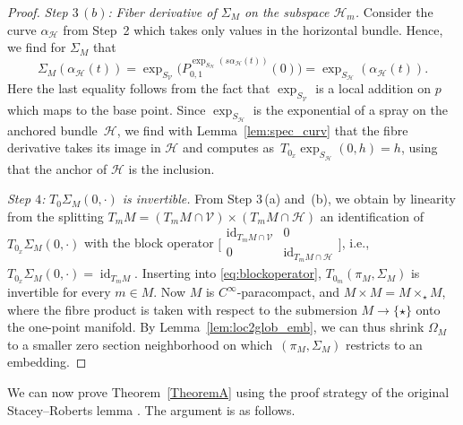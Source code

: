 \documentclass[11pt]{article}
\numberwithin{equation}{section}
\numberwithin{equation}{section}
\newcommand{\cH}{\ensuremath{\mathcal{H}}}
\newcommand{\cV}{\ensuremath{\mathcal{V}}}
\DeclareMathOperator{\id}{id}
\begin{document}
\begin{proof}
{\it Step $3\,(b)$:} \emph{Fiber derivative of $\Sigma_M$ on the subspace $\cH_m$.} Consider the curve $\alpha_\cH$ from Step~2 which takes only values in the horizontal bundle. Hence, we find for $\Sigma_M$ that
\begin{displaymath}\Sigma_M (\alpha_{\cH}(t)) =\exp_{S_{\cV}}\bigl(P_{0,1}^{\exp_{S_\cH}(s\alpha_{\cH}(t))}(0)\bigr)=\exp_{S_\cH}(\alpha_\cH(t)).
\end{displaymath}
Here the last equality follows from the fact that $\exp_{S_{\cV}}$ is a local addition on $p$ which maps \smash{$0\raisebox{2pt}{${}_{\exp_{S_{\cH}}(\alpha_\cH(t))}$}$} to the base point. Since $\exp_{S_\cH}$ is the exponential of a spray on the anchored bundle~$\cH$, we find with Lemma~\ref{lem:spec_curv} that the fibre derivative takes its image in $\cH$ and computes as~$T_{0_x} \exp_{S_{\cH}}(0,h)=h$, using that the anchor of $\cH$ is the inclusion.

{\it Step $4$:} \emph{$T_0\Sigma_M(0,\cdot)$ is invertible.} From Step 3\,(a) and~(b), we obtain by linearity from the splitting $T_m M = (T_m M \cap \cV) \times (T_mM \cap \cH)$ an identification of $T_{0_x}\Sigma_M (0,\cdot )$ with the block operator
$\bigl[\begin{smallmatrix} \id_{T_m M \cap \cV} & 0 \\ 0 & \id_{T_mM \cap \cH}\end{smallmatrix}\bigr]$, i.e., $T_{0_x}\Sigma_M (0,\cdot ) = \id_{T_m M}$. Inserting into \eqref{eq:blockoperator}, $T_{0_m} (\pi_M,\Sigma_M)$ is invertible for every $m \in M$. Now $M$ is $C^\infty$-paracompact, and $M \times M = M \times_\star M$, where the fibre product is taken with respect to the submersion $M \rightarrow \{\star\}$ onto the one-point manifold. By Lemma~\ref{lem:loc2glob_emb}, we can thus shrink $\Omega_M$ to a smaller zero section neighborhood on which~$(\pi_M,\Sigma_M)$ restricts to an embedding.
\end{proof}

We can now prove Theorem~\ref{TheoremA} using the proof strategy of the original Stacey--Roberts lemma \cite[Lemma~2.4]{AaS19}. The argument is as follows.
\end{document}
